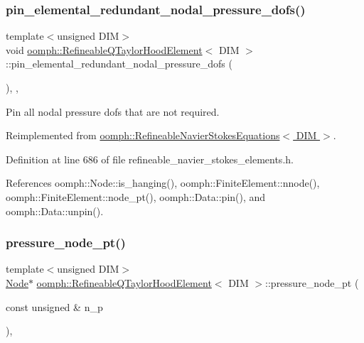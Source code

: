 \subsubsection{\texorpdfstring{pin\+\_\+elemental\+\_\+redundant\+\_\+nodal\+\_\+pressure\+\_\+dofs()}{pin\_elemental\_redundant\_nodal\_pressure\_dofs()}}
{\footnotesize\ttfamily template$<$unsigned D\+IM$>$ \\
void \hyperlink{classoomph_1_1RefineableQTaylorHoodElement}{oomph\+::\+Refineable\+Q\+Taylor\+Hood\+Element}$<$ D\+IM $>$\+::pin\+\_\+elemental\+\_\+redundant\+\_\+nodal\+\_\+pressure\+\_\+dofs (\begin{DoxyParamCaption}{ }\end{DoxyParamCaption})\hspace{0.3cm}{\ttfamily [inline]}, {\ttfamily [private]}, {\ttfamily [virtual]}}



Pin all nodal pressure dofs that are not required. 



Reimplemented from \hyperlink{classoomph_1_1RefineableNavierStokesEquations_a5dbf8764b44554159043a45df312a7e3}{oomph\+::\+Refineable\+Navier\+Stokes\+Equations$<$ D\+I\+M $>$}.



Definition at line 686 of file refineable\+\_\+navier\+\_\+stokes\+\_\+elements.\+h.



References oomph\+::\+Node\+::is\+\_\+hanging(), oomph\+::\+Finite\+Element\+::nnode(), oomph\+::\+Finite\+Element\+::node\+\_\+pt(), oomph\+::\+Data\+::pin(), and oomph\+::\+Data\+::unpin().

\mbox{\label{classoomph_1_1RefineableQTaylorHoodElement_a03c79a396ff4d0bb7c8537fd92abb211}} 
\subsubsection{\texorpdfstring{pressure\+\_\+node\+\_\+pt()}{pressure\_node\_pt()}}
{\footnotesize\ttfamily template$<$unsigned D\+IM$>$ \\
\hyperlink{classoomph_1_1Node}{Node}$\ast$ \hyperlink{classoomph_1_1RefineableQTaylorHoodElement}{oomph\+::\+Refineable\+Q\+Taylor\+Hood\+Element}$<$ D\+IM $>$\+::pressure\+\_\+node\+\_\+pt (\begin{DoxyParamCaption}\item[{const unsigned \&}]{n\+\_\+p }\end{DoxyParamCaption})\hspace{0.3cm}{\ttfamily [inline]}, {\ttfamily [virtual]}}



